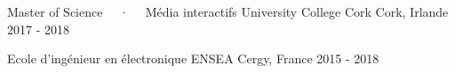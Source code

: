 

\begin{cventries}

	\cventry
	{Master of Science ~~·~~ Média interactifs} %
	{University College Cork} %
	{Cork, Irlande} %
	{2017 - 2018} %
	{}

	\cventry
	{Ecole d'ingénieur en électronique}
	{ENSEA} %
	{Cergy, France} %
	{2015 - 2018} %
	{}
\end{cventries}
